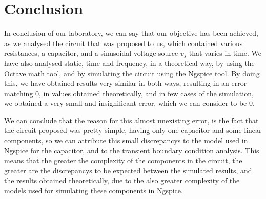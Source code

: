 \section{Conclusion} 
\label{sec:conclusion}

In conclusion of our laboratory, we can say that our objective has been achieved, as we analysed the circuit that was proposed to us, which contained various resistances, a capacitor, and a sinusoidal voltage source $v_s$ that varies in time. We have also analysed static, time and frequency, in a theoretical way, by using the Octave math tool, and by simulating the circuit using the Ngspice tool. By doing this, we have obtained results very similar in both ways, resulting in an error matching 0, in values obtained theoretically, and in few cases of the simulation, we obtained a very small and insignificant error, which we can consider to be 0.\par
We can conclude that the reason for this almost unexisting error, is the fact that the circuit proposed was pretty simple, having only one capacitor and some linear components, so we can attribute this small discrepancys to the model used in Ngspice for the capacitor, and to the transient boundary condition analysis. This means that the greater the complexity of the components in the circuit, the greater are the discrepancys to be expected between the simulated results, and the results obtained theoretically, due to the also greater complexity of the models used for simulating these components in Ngspice.
